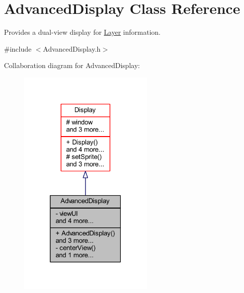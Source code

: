 \hypertarget{class_advanced_display}{}\section{Advanced\+Display Class Reference}
\label{class_advanced_display}


Provides a dual-\/view display for \hyperlink{class_layer}{Layer} information.  




{\ttfamily \#include $<$Advanced\+Display.\+h$>$}



Collaboration diagram for Advanced\+Display\+:
\nopagebreak
\begin{figure}[H]
\begin{center}
\leavevmode
\includegraphics[width=186pt]{class_advanced_display__coll__graph}
\end{center}
\end{figure}

